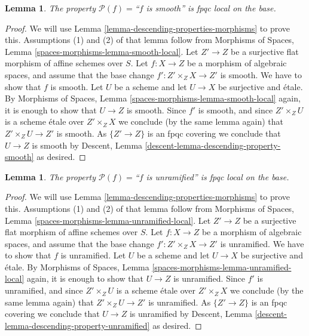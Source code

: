 \documentclass{stacks-project}
\theoremstyle{plain}
\newtheorem{lemma}[subsection]{Lemma}
\theoremstyle{definition}
\theoremstyle{remark}
\numberwithin{equation}{subsection}
\begin{document}
\begin{lemma}
\label{lemma-descending-property-smooth}
The property $\mathcal{P}(f) =$``$f$ is smooth''
is fpqc local on the base.
\end{lemma}

\begin{proof}
We will use
Lemma \ref{lemma-descending-properties-morphisms}
to prove this. Assumptions (1) and (2) of that lemma follow from
Morphisms of Spaces,
Lemma \ref{spaces-morphisms-lemma-smooth-local}.
Let $Z' \to Z$ be a surjective flat morphism of affine schemes over $S$.
Let $f : X \to Z$ be a morphism of algebraic spaces, and assume
that the base change $f' : Z' \times_Z X \to Z'$ is smooth.
We have to show that $f$ is smooth. Let $U$ be a scheme
and let $U \to X$ be surjective and \'etale. By
Morphisms of Spaces,
Lemma \ref{spaces-morphisms-lemma-smooth-local}
again, it is enough to show that $U \to Z$ is smooth.
Since $f'$ is smooth, and since $Z' \times_Z U$ is a
scheme \'etale over $Z' \times_Z X$ we conclude (by the same lemma again) that
$Z' \times_Z U \to Z'$ is smooth.
As $\{Z' \to Z\}$ is an fpqc covering we conclude that
$U \to Z$ is smooth by
Descent, Lemma \ref{descent-lemma-descending-property-smooth}
as desired.
\end{proof}

\begin{lemma}
\label{lemma-descending-property-unramified}
The property $\mathcal{P}(f) =$``$f$ is unramified''
is fpqc local on the base.
\end{lemma}

\begin{proof}
We will use
Lemma \ref{lemma-descending-properties-morphisms}
to prove this. Assumptions (1) and (2) of that lemma follow from
Morphisms of Spaces,
Lemma \ref{spaces-morphisms-lemma-unramified-local}.
Let $Z' \to Z$ be a surjective flat morphism of affine schemes over $S$.
Let $f : X \to Z$ be a morphism of algebraic spaces, and assume
that the base change $f' : Z' \times_Z X \to Z'$ is unramified.
We have to show that $f$ is unramified. Let $U$ be a scheme
and let $U \to X$ be surjective and \'etale. By
Morphisms of Spaces,
Lemma \ref{spaces-morphisms-lemma-unramified-local}
again, it is enough to show that $U \to Z$ is unramified.
Since $f'$ is unramified, and since $Z' \times_Z U$ is a
scheme \'etale over $Z' \times_Z X$ we conclude (by the same lemma again) that
$Z' \times_Z U \to Z'$ is unramified.
As $\{Z' \to Z\}$ is an fpqc covering we conclude that
$U \to Z$ is unramified by
Descent, Lemma \ref{descent-lemma-descending-property-unramified}
as desired.
\end{proof}
\end{document}
